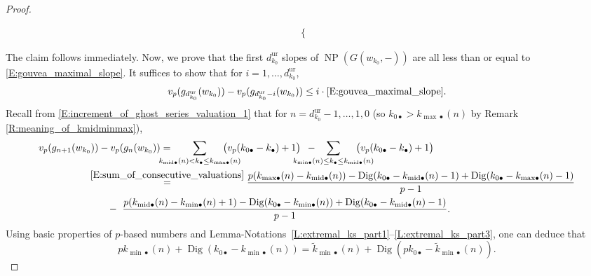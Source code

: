 \begin{proof}
\begin{itemize}
\begin{align*}
\begin{cases}
    \end{cases}
    \end{align*}
    \end{itemize}
    The claim follows immediately.
    Now, we prove that the first $d_{k_0}^{\mathrm{ur}}$ slopes of ${\operatorname{NP}}(G(w_{k_0}, -))$ are all less than or equal to \eqref{E:gouvea_maximal_slope}. It suffices to show that for $i = 1, \dots, d_{k_0}^{\mathrm{ur}}$,
    $$
    v_p(g_{d_{k_0}^{\mathrm{ur}}}(w_{k_0})) - v_p(g_{d_{k_0}^{\mathrm{ur}}-i}(w_{k_0})) \leq i \cdot \eqref{E:gouvea_maximal_slope}.
    $$
    Recall from \eqref{E:increment_of_ghost_series_valuation_1} that for
    $n = d_{k_0}^{\mathrm{ur}}-1,\dots,1, 0$ (so $k_{0\bullet} > k_{{\max}\bullet}(n)$ by Remark \ref{R:meaning_of_kmidminmax}),
    \begin{eqnarray}
    \label{E:vp_difference_k-1_p_plus_1_conjecture}
    \nonumber
     &v_p(g_{n+1}(w_{k_0})) - v_p(g_n(w_{k_0})) = \hspace{-15pt}\displaystyle\sum_{
    k_{{\mathrm{mid}}\bullet}(n) < k_\bullet \leq k_{{\max}\bullet}(n)}
    \hspace{-20pt}\big( v_p(k_{0\bullet} - k_\bullet)+1 \big)\ \,-  \hspace{-25pt} \displaystyle\sum_{
    k_{{\min}\bullet}(n) \leq k_\bullet \leq k_{{{\mathrm{mid}}}\bullet}(n)}
    \hspace{-20pt}\big( v_p(k_{0\bullet}-k_\bullet)+1 \big)
    \\
    &\qquad\qquad \quad
    \stackrel{\eqref{E:sum_of_consecutive_valuations}}= \dfrac{p(k_{{\max}\bullet}(n) - k_{{\mathrm{mid}}\bullet}(n)) - {\operatorname{Dig}}(k_{0\bullet}-k_{{\mathrm{mid}}\bullet}(n)-1)
    + {\operatorname{Dig}}(k_{0\bullet} - k_{{\max}\bullet}(n)-1)
    }{p-1}
    \\
    \nonumber
    & \qquad\qquad\qquad\quad -\ \dfrac{p(k_{{{\mathrm{mid}}}\bullet}(n) - k_{{\min}\bullet}(n)+1) - {\operatorname{Dig}}(k_{0\bullet} - k_{{\min}\bullet}(n)) + {\operatorname{Dig}}( k_{0\bullet}- k_{{\mathrm{mid}}\bullet}(n)-1)
    }{p-1}.
    \end{eqnarray}
    Using basic properties of $p$-based numbers and Lemma-Notations~\ref{L:extremal_ks_part1}--\ref{L:extremal_ks_part3}, one can deduce that
    \begin{equation*}
    pk_{{\min}\bullet}(n)+ {\operatorname{Dig}}(k_{0\bullet} - k_{{\min}\bullet}(n)) = \tilde k_{{\min}\bullet}(n)+ {\operatorname{Dig}}(pk_{0\bullet} - \tilde k_{{\min}\bullet}(n)).
    \end{equation*}

\end{proof}

